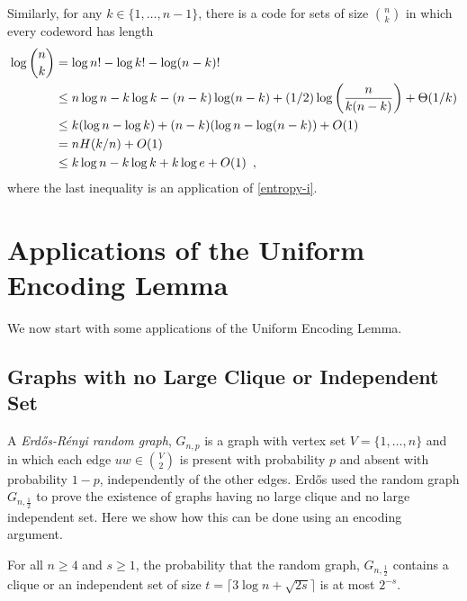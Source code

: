 \documentclass{patmorin}
\begin{document}
Similarly, for any $k\in\{1,\ldots,n-1\}$, there is a code for sets of 
size $\binom{n}{k}$ in which every codeword has length 
\begin{align}
  \log \binom{n}{k}
     & = \log n! - \log k! - \log (n-k)! \notag \\
     & \le n\log n - k\log k - (n-k)\log(n-k) + (1/2)\log\left(\frac{n}{k(n-k)}\right) + \Theta(1/k) \notag \\
     & \le k(\log n-\log k) + (n-k)(\log n - \log(n-k)) + O(1) \notag \\
     & = nH(k/n) + O(1) \notag \\
     & \le k\log n - k\log k + k\log e + O(1) \enspace , \eqlabel{log-n-choose-k}
\end{align}
where the last inequality is an application of \eqref{entropy-i}.


\section{Applications of the Uniform Encoding Lemma}

We now start with some applications of the Uniform Encoding Lemma.

\subsection{Graphs with no Large Clique or Independent Set}


A \emph{Erd\H{o}s-R\'enyi random graph}, $G_{n,p}$ is a graph with vertex
set $V=\{1,\ldots,n\}$ and in which each edge $uw\in \binom{V}{2}$
is present with probability $p$ and absent with probability $1-p$,
independently of the other edges.  Erd\H{o}s \cite{erdos:some} used the random
graph $G_{n,\frac{1}{2}}$ to prove the existence of graphs having no
large clique and no large independent set. Here we show how this can be
done using an encoding argument.

\begin{thm}
  For all $n\ge 4$ and $s\ge 1$, the probability that the random graph,
  $G_{n,\frac{1}{2}}$ contains a clique or an independent set of size $t =
  \lceil 3\log n + \sqrt{2s}\rceil$ is at most $2^{-s}$.
\end{thm}
\end{document}

